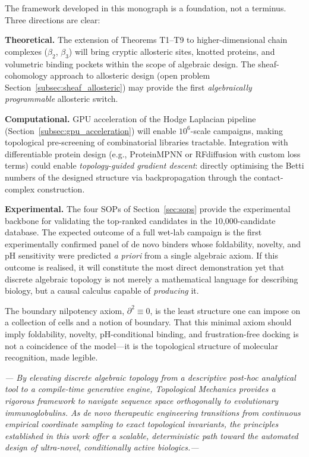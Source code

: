 The framework developed in this monograph is a foundation, not a terminus.
Three directions are clear:

\textbf{Theoretical.}  The extension of Theorems T1--T9 to higher-dimensional
chain complexes ($\beta_2$, $\beta_3$) will bring cryptic allosteric sites,
knotted proteins, and volumetric binding pockets within the scope of algebraic
design.  The sheaf-cohomology approach to allosteric design (open problem
Section~\ref{subsec:sheaf_allosteric}) may provide the first
\emph{algebraically programmable} allosteric switch.

\textbf{Computational.}  GPU acceleration of the Hodge Laplacian pipeline
(Section~\ref{subsec:gpu_acceleration}) will enable $10^6$-scale campaigns,
making topological pre-screening of combinatorial libraries tractable.
Integration with differentiable protein design (e.g., ProteinMPNN or
RFdiffusion with custom loss terms) could enable \emph{topology-guided
gradient descent}: directly optimising the Betti numbers of the designed
structure via backpropagation through the contact-complex construction.

\textbf{Experimental.}  The four SOPs of Section~\ref{sec:sops} provide the
experimental backbone for validating the top-ranked candidates in the
10,000-candidate database.  The expected outcome of a full wet-lab campaign is
the first experimentally confirmed panel of de novo binders whose foldability,
novelty, and pH sensitivity were predicted \emph{a priori} from a single
algebraic axiom.  If this outcome is realised, it will constitute the most
direct demonstration yet that discrete algebraic topology is not merely a
mathematical language for describing biology, but a causal calculus capable of
\emph{producing} it.

\bigskip
\noindent The boundary nilpotency axiom, $\partial^2 \equiv 0$, is the
least structure one can impose on a collection of cells and a notion of
boundary.  That this minimal axiom should imply foldability, novelty,
pH-conditional binding, and frustration-free docking is not a coincidence
of the model---it is the topological structure of molecular recognition,
made legible.

\bigskip
\begin{flushright}
\textit{--- By elevating discrete algebraic topology from a descriptive post-hoc analytical tool to a compile-time generative engine, Topological Mechanics provides a rigorous framework to navigate sequence space orthogonally to evolutionary immunoglobulins. As de novo therapeutic engineering transitions from continuous empirical coordinate sampling to exact topological invariants, the principles established in this work offer a scalable, deterministic path toward the automated design of ultra-novel, conditionally active biologics.---}
\end{flushright}
